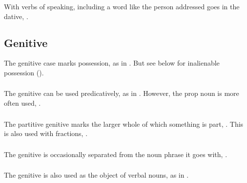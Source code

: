 \subsubsection{} With verbs of speaking, including a word like
  the person addressed goes in the dative,  .

\subsection{Genitive} The genitive case marks possession, as in
 . But see below for
inalienable possession ().

\subsubsection{} The genitive can be used predicatively, as in
 .  How\-ever, the prop
noun   is more often used,
 . \label{syn:pum:genitive}

\subsubsection{} The partitive genitive marks the larger whole of
which something is part,  .  This is also used with fractions,  . 
\label{syn:partitive-gen}

\subsubsection{} The genitive is occasionally separated from the noun
phrase it goes with,  .

\subsubsection{} The genitive is also used as the object of verbal
nouns, as in  .

